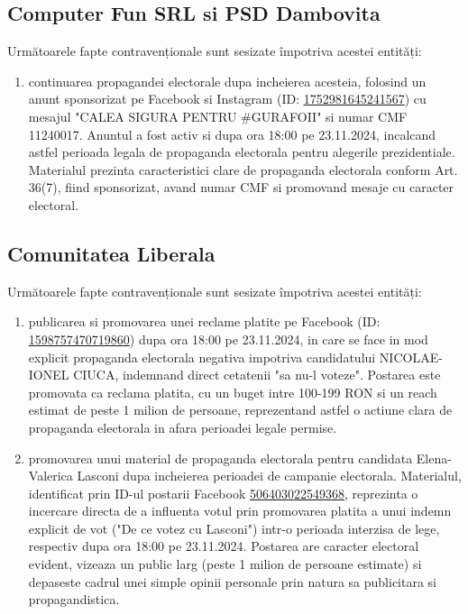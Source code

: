 \documentclass[a4paper,12pt]{article}
\begin{document}
\vspace{0.5cm}

\subsection{Computer Fun SRL si PSD Dambovita}
Următoarele fapte contravenționale sunt sesizate împotriva acestei entități:

\begin{enumerate}[leftmargin=*, label=\arabic*.)]
    \item continuarea propagandei electorale dupa incheierea acesteia, folosind un anunt sponsorizat pe Facebook si Instagram (ID: \href{https://www.facebook.com/ads/library/?id=1752981645241567}{1752981645241567}) cu mesajul "CALEA SIGURA PENTRU \#GURAFOII" si numar CMF 11240017. Anuntul a fost activ si dupa ora 18:00 pe 23.11.2024, incalcand astfel perioada legala de propaganda electorala pentru alegerile prezidentiale. Materialul prezinta caracteristici clare de propaganda electorala conform Art. 36(7), fiind sponsorizat, avand numar CMF si promovand mesaje cu caracter electoral.
\end{enumerate}

\vspace{0.5cm}

\subsection{Comunitatea Liberala}
Următoarele fapte contravenționale sunt sesizate împotriva acestei entități:

\begin{enumerate}[leftmargin=*, label=\arabic*.)]
    \item publicarea si promovarea unei reclame platite pe Facebook (ID: \href{https://www.facebook.com/ads/library/?id=1598757470719860}{1598757470719860}) dupa ora 18:00 pe 23.11.2024, in care se face in mod explicit propaganda electorala negativa impotriva candidatului NICOLAE-IONEL CIUCA, indemnand direct cetatenii "sa nu-l voteze". Postarea este promovata ca reclama platita, cu un buget intre 100-199 RON si un reach estimat de peste 1 milion de persoane, reprezentand astfel o actiune clara de propaganda electorala in afara perioadei legale permise.
    \item promovarea unui material de propaganda electorala pentru candidata Elena-Valerica Lasconi dupa incheierea perioadei de campanie electorala. Materialul, identificat prin ID-ul postarii Facebook \href{https://www.facebook.com/ads/library/?id=506403022549368}{506403022549368}, reprezinta o incercare directa de a influenta votul prin promovarea platita a unui indemn explicit de vot ("De ce votez cu Lasconi") intr-o perioada interzisa de lege, respectiv dupa ora 18:00 pe 23.11.2024. Postarea are caracter electoral evident, vizeaza un public larg (peste 1 milion de persoane estimate) si depaseste cadrul unei simple opinii personale prin natura sa publicitara si propagandistica.
\end{enumerate}
\end{document}

